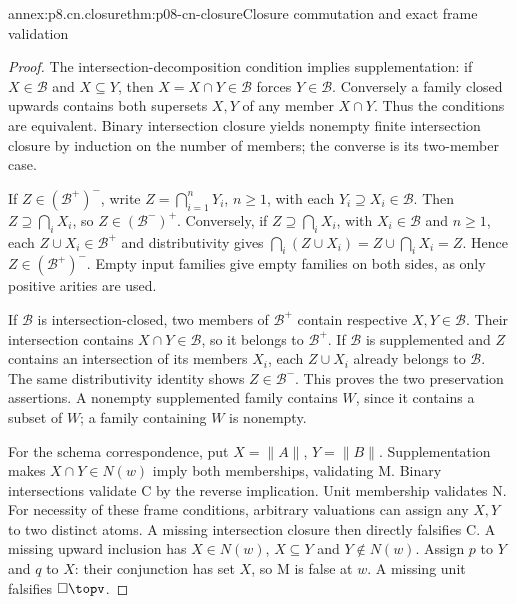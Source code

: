 \begin{annexitem}{annex:p8.cn.closure}{thm:p08-cn-closure}{Closure commutation and exact frame validation}
\begin{proof}
The intersection-decomposition condition implies supplementation:
if \(X\in\mathcal B\) and \(X\subseteq Y\), then
\(X=X\cap Y\in\mathcal B\) forces \(Y\in\mathcal B\).
Conversely a family closed upwards contains both supersets \(X,Y\)
of any member \(X\cap Y\). Thus the conditions are equivalent.
Binary intersection closure yields nonempty finite intersection
closure by induction on the number of members; the converse is
its two-member case.

If \(Z\in(\mathcal B^+)^-\), write
\(Z=\bigcap_{i=1}^nY_i\), \(n\geq1\), with each
\(Y_i\supseteq X_i\in\mathcal B\). Then
\(Z\supseteq\bigcap_iX_i\), so \(Z\in(\mathcal B^-)^+\).
Conversely, if \(Z\supseteq\bigcap_iX_i\), with
\(X_i\in\mathcal B\) and \(n\geq1\), each
\(Z\cup X_i\in\mathcal B^+\) and distributivity gives
\(\bigcap_i(Z\cup X_i)=Z\cup\bigcap_iX_i=Z\).
Hence \(Z\in(\mathcal B^+)^-\). Empty input families
give empty families on both sides, as only positive arities are used.

If \(\mathcal B\) is intersection-closed, two members of
\(\mathcal B^+\) contain respective \(X,Y\in\mathcal B\).
Their intersection contains \(X\cap Y\in\mathcal B\),
so it belongs to \(\mathcal B^+\). If \(\mathcal B\) is
supplemented and \(Z\) contains an intersection of its members
\(X_i\), each \(Z\cup X_i\) already belongs to \(\mathcal B\).
The same distributivity identity shows \(Z\in\mathcal B^-\).
This proves the two preservation assertions. A nonempty supplemented
family contains \(W\), since it contains a subset of \(W\);
a family containing \(W\) is nonempty.

For the schema correspondence, put \(X=\|A\|\), \(Y=\|B\|\).
Supplementation makes \(X\cap Y\in N(w)\) imply both
memberships, validating M. Binary intersections validate C by
the reverse implication. Unit membership validates N.
For necessity of these frame conditions, arbitrary valuations can
assign any \(X,Y\) to two distinct atoms. A missing intersection
closure then directly falsifies C. A missing upward inclusion has
\(X\in N(w)\), \(X\subseteq Y\) and \(Y\notin N(w)\).
Assign \(p\) to \(Y\) and \(q\) to \(X\): their conjunction
has set \(X\), so M is false at \(w\). A missing unit falsifies
\(\Box\topv\).


\end{proof}
\end{annexitem}

